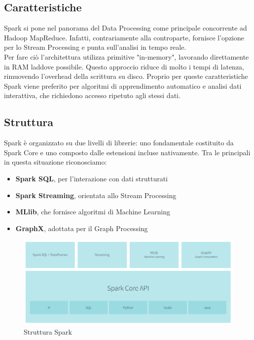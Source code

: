 \subsection{Caratteristiche}
Spark si pone nel panorama del Data Processing come principale concorrente ad Hadoop MapReduce. Infatti, contrariamente alla controparte, fornisce l'opzione per lo Stream Processing e punta sull'analisi in tempo reale.\\
Per fare ciò l'architettura utilizza primitive "in-memory", lavorando direttamente in RAM laddove possibile. Questo approccio riduce di molto i tempi di latenza, rimuovendo l'overhead della scrittura su disco. Proprio per queste caratteristiche Spark viene preferito per algoritmi di apprendimento automatico e analisi dati interattiva, che richiedono accesso ripetuto agli stessi dati.

\subsection{Struttura}
Spark è organizzato su due livelli di librerie: uno fondamentale costituito da Spark Core e uno composto dalle estensioni incluse nativamente. Tra le principali in questa situazione riconosciamo:
\begin{itemize}
	\item \textbf{Spark SQL}, per l'interazione con dati strutturati
	\item \textbf{Spark Streaming}, orientata allo Stream Processing
	\item \textbf{MLlib}, che fornisce algoritmi di Machine Learning
	\item \textbf{GraphX}, adottata per il Graph Processing
\end{itemize}  

\begin{figure}[h]
	\centering
	\includegraphics[scale=0.75]{Figures/spark_structure.png}
	\decoRule
	\caption[Struttura Spark]{Struttura Spark}
	\label{fig:Struttura Spark}
\end{figure}

